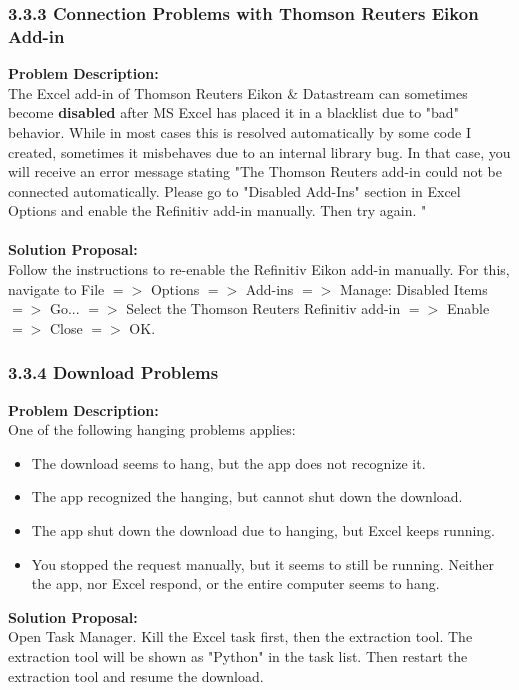\subsubsection{3.3.3 Connection Problems with Thomson Reuters Eikon Add-in}
\textbf{Problem Description: }  \\
The Excel add-in of Thomson Reuters Eikon \& Datastream can sometimes become \textbf{disabled} after MS Excel has placed it in a blacklist due to "bad" behavior. While in most cases this is resolved automatically by some code I created, sometimes it misbehaves due to an internal library bug. In that case, you will receive an error message stating "The Thomson Reuters add-in could not be connected automatically. Please go to "Disabled Add-Ins" section in Excel Options and enable the Refinitiv add-in manually. Then try again. " \\ \\
\textbf{Solution Proposal:} \\
Follow the instructions to re-enable the Refinitiv Eikon add-in manually. For this, navigate to File $ => $ Options $ => $ Add-ins $  => $ Manage: Disabled Items $ => $ Go... $ => $ Select the Thomson Reuters Refinitiv add-in $ => $ Enable $ => $ Close $ => $ OK. 

\subsubsection{3.3.4 Download Problems}
\textbf{Problem Description: }  \\
One of the following hanging problems applies: 
\begin{itemize}
	\item The download seems to hang, but the app does not recognize it. 
	\item The app recognized the hanging, but cannot shut down the download. 
	\item The app shut down the download due to hanging, but Excel keeps running. 
	\item You stopped the request manually, but it seems to still be running. 
	Neither the app, nor Excel respond, or the entire computer seems to hang. 
\end{itemize} 
\textbf{Solution Proposal:} \\
Open Task Manager. Kill the Excel task first, then the extraction tool. The extraction tool will be shown as "Python" in the task list. Then restart the extraction tool and resume the download. 

